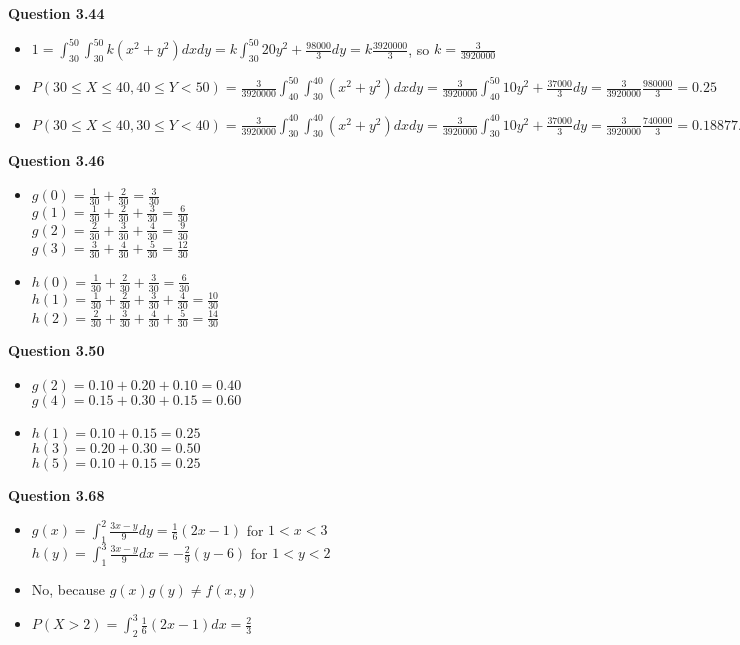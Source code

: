 \documentclass{article}
\begin{document}
    \textbf{Question 3.44}
    \begin{itemize}
        \item $1=\int_{30}^{50}\int_{30}^{50}k(x^2+y^2)dxdy = k\int_{30}^{50}20y^2+\frac{98000}{3}dy = k\frac{3920000}{3}$, so $k= \frac{3}{3920000}$
        \item $P(30\leq X \leq 40, 40\leq Y < 50) = \frac{3}{3920000}\int_{40}^{50}\int_{30}^{40}(x^2+y^2)dxdy = \frac{3}{3920000}\int_{40}^{50}10y^2+\frac{37000}{3}dy = \frac{3}{3920000}\frac{980000}{3} = 0.25$
        \item $P(30\leq X \leq 40, 30\leq Y < 40) = \frac{3}{3920000}\int_{30}^{40}\int_{30}^{40}(x^2+y^2)dxdy = \frac{3}{3920000}\int_{30}^{40}10y^2+\frac{37000}{3}dy = \frac{3}{3920000}\frac{740000}{3} = 0.18877...$
    \end{itemize}
    \textbf{Question 3.46}
    \begin{itemize}
        \item $g(0)=\frac{1}{30}+\frac{2}{30} = \frac{3}{30}$\\
              $g(1)=\frac{1}{30}+\frac{2}{30}+\frac{3}{30}=\frac{6}{30}$\\
              $g(2)=\frac{2}{30}+\frac{3}{30}+\frac{4}{30}=\frac{9}{30}$\\
              $g(3)=\frac{3}{30}+\frac{4}{30}+\frac{5}{30}=\frac{12}{30}$
        \item $h(0)=\frac{1}{30}+\frac{2}{30}+\frac{3}{30}=\frac{6}{30}$\\
              $h(1)=\frac{1}{30}+\frac{2}{30}+\frac{3}{30}+\frac{4}{30}=\frac{10}{30}$\\
              $h(2)=\frac{2}{30}+\frac{3}{30}+\frac{4}{30}+\frac{5}{30}=\frac{14}{30}$
    \end{itemize}
    \textbf{Question 3.50}
    \begin{itemize}
        \item $g(2) = 0.10+0.20+0.10=0.40$\\
              $g(4) = 0.15+0.30+0.15=0.60$
        \item $h(1) = 0.10+0.15=0.25$\\
              $h(3) = 0.20+0.30=0.50$\\
              $h(5) = 0.10+0.15=0.25$
    \end{itemize}
    \textbf{Question 3.68}
    \begin{itemize}
        \item $g(x)=\int_{1}^{2}\frac{3x-y}{9}dy = \frac{1}{6}(2x-1)$ for $1<x<3$\\
              $h(y)=\int_{1}^{3}\frac{3x-y}{9}dx = -\frac{2}{9}(y-6)$ for $1<y<2$
        \item No, because $g(x)g(y)\not= f(x,y)$
        \item $P(X>2) = \int_{2}^{3}\frac{1}{6}(2x-1)dx = \frac{2}{3}$
    \end{itemize}
\end{document}
